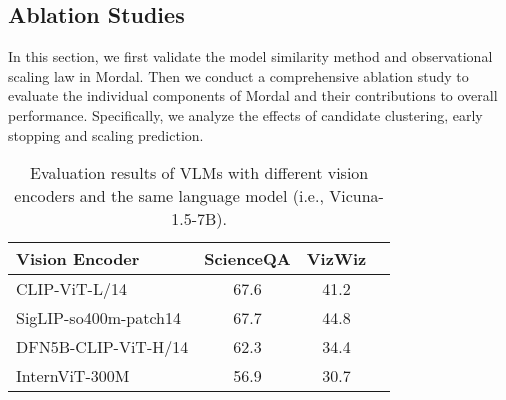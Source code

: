 





\subsection{Ablation Studies}
\label{sec:eval_ablation}
In this section, we first validate the model similarity method and observational scaling law in Mordal. Then we conduct a comprehensive ablation study to evaluate the individual components of Mordal and their contributions to overall performance. Specifically, we analyze the effects of candidate clustering, early stopping and scaling prediction. 


\begin{table}[!t]
\centering
\caption{Evaluation results of VLMs with different vision encoders and the same language model (i.e., Vicuna-1.5-7B). }
\label{table:vlm_evaluation}
\footnotesize
\begin{tabular}{lccc}
    \toprule
    Vision Encoder & ScienceQA & VizWiz \\
    \midrule
    CLIP-ViT-L/14 & 67.6 & 41.2\\
    SigLIP-so400m-patch14 & 67.7 & 44.8\\
    DFN5B-CLIP-ViT-H/14  & 62.3 & 34.4\\
    InternViT-300M & 56.9 & 30.7\\
\bottomrule
\end{tabular}
\label{table:model_similarity}
\vspace{-4mm}
\end{table}%

